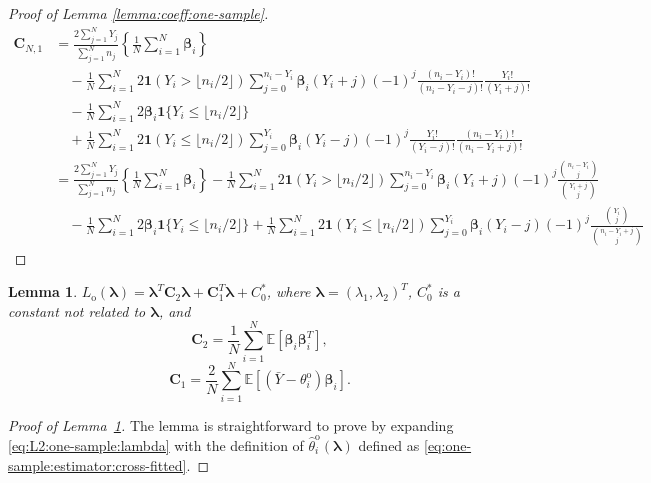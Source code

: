 \documentclass[12pt,letterpaper]{article}
\newtheorem{lemma}{Lemma}[section]
\begin{document}
\begin{proof}[Proof of Lemma \ref{lemma:coeff:one-sample}]
\begin{equation}\label{eq:coefficient:linear:ML}
\begin{array}{rl}
    \mathbf{C}_{N,1}\!\!\!\!\!\!&\displaystyle=\frac{2\sum_{j=1}^NY_j}{\sum_{j=1}^Nn_j}\left\{\frac{1}{N}\sum_{i=1}^N\boldsymbol{\beta}_i\right\}\\
    &\displaystyle\quad-\frac{1}{N}\sum_{i=1}^N2\mathbf{1}(Y_{i} > \lfloor n_i/2\rfloor)\!\!\!\sum_{j=0}^{n_{i}-Y_{i}}\!\!\!\boldsymbol{\beta}_i(Y_i+j)(-1)^{j}\frac{(n_{i}-Y_{i})!}{(n_{i}-Y_{i}-j)!}\frac{Y_{i}!}{(Y_{i}+j)!}\\
    &\quad\displaystyle-\frac{1}{N}\sum_{i=1}^N2\boldsymbol{\beta}_i\mathbf{1}\{Y_i\leq \lfloor n_i/2\rfloor\}\\
    &\quad\displaystyle+\frac{1}{N}\sum_{i=1}^N2\mathbf{1}(Y_{i}\leq \lfloor n_i/2\rfloor)\sum_{j=0}^{Y_{i}}\boldsymbol{\beta}_i(Y_i-j)(-1)^{j}\frac{Y_{i}!}{(Y_{i}-j)!}\frac{(n_{i} - Y_{i})!}{(n_{i}-Y_{i}+j)!}\\
    &\displaystyle=\frac{2\sum_{j=1}^NY_j}{\sum_{j=1}^Nn_j}\left\{\frac{1}{N}\sum_{i=1}^N\boldsymbol{\beta}_i\right\}-\frac{1}{N}\sum_{i=1}^N2\mathbf{1}(Y_{i} > \lfloor n_i/2\rfloor)\!\!\!\sum_{j=0}^{n_{i}-Y_{i}}\!\!\!\boldsymbol{\beta}_i(Y_i+j)(-1)^{j}\frac{\binom{n_i-Y_i}{j}}{\binom{Y_i+j}{j}}\\
    &\quad\displaystyle-\frac{1}{N}\sum_{i=1}^N2\boldsymbol{\beta}_i\mathbf{1}\{Y_i\leq \lfloor n_i/2\rfloor\}+\frac{1}{N}\sum_{i=1}^N2\mathbf{1}(Y_{i}\leq \lfloor n_i/2\rfloor)\sum_{j=0}^{Y_{i}}\boldsymbol{\beta}_i(Y_i-j)(-1)^{j}\frac{\binom{Y_i}{j}}{\binom{n_i-Y_i+j}{j}}
\end{array}
\end{equation}
\end{proof}

\begin{lemma}\label{lemma:one-sample:objective:quadratic}
$L_{\mathrm{o}}(\boldsymbol{\lambda})=\boldsymbol{\lambda}^T\mathbf{C}_{2}\boldsymbol{\lambda}+\mathbf{C}_{1}^T\boldsymbol{\lambda}+C_0^*$, where $\boldsymbol{\lambda}=(\lambda_1,\lambda_2)^T$, $C_0^*$ is a constant not related to $\boldsymbol{\lambda}$, and 
\begin{equation}\label{eq:coefficient:quadratic:ML:objective}
    \mathbf{C}_{2}=\frac{1}{N}\sum_{i=1}^N\mathbb{E}\left[\boldsymbol{\beta}_i\boldsymbol{\beta}_i^T\right],
\end{equation}
\begin{equation}\label{eq:coeff:linear:one-sample:objective}
\mathbf{C}_{1}=\frac{2}{N}\sum_{i=1}^N\mathbb{E}\left[\left(\bar{Y}-\theta_i^{\mathrm{o}}\right)\boldsymbol{\beta}_i\right].
\end{equation} 
\end{lemma}
\begin{proof}[Proof of Lemma~\ref{lemma:one-sample:objective:quadratic}]
The lemma is straightforward to prove by expanding \eqref{eq:L2:one-sample:lambda} with the definition of $\hat{\theta}_i^{\mathrm{o}}(\boldsymbol{\lambda})$ defined as \eqref{eq:one-sample:estimator:cross-fitted}. 
\end{proof}
\end{document}
